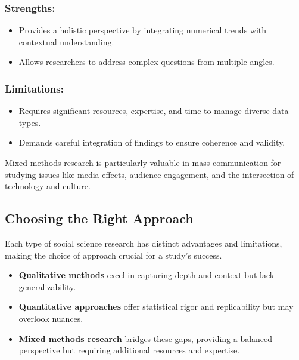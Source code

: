 \documentclass[
]{book}
\providecommand{\tightlist}{%
  \setlength{\itemsep}{0pt}\setlength{\parskip}{0pt}}
\begin{document}
\subsubsection*{Strengths:}\label{strengths-2}

\begin{itemize}
\tightlist
\item
  Provides a holistic perspective by integrating numerical trends with contextual understanding.
\item
  Allows researchers to address complex questions from multiple angles.
\end{itemize}

\subsubsection*{Limitations:}\label{limitations-2}

\begin{itemize}
\tightlist
\item
  Requires significant resources, expertise, and time to manage diverse data types.
\item
  Demands careful integration of findings to ensure coherence and validity.
\end{itemize}

Mixed methods research is particularly valuable in mass communication for studying issues like media effects, audience engagement, and the intersection of technology and culture.

\subsection*{Choosing the Right Approach}\label{choosing-the-right-approach}

Each type of social science research has distinct advantages and limitations, making the choice of approach crucial for a study's success.

\begin{itemize}
\tightlist
\item
  \textbf{Qualitative methods} excel in capturing depth and context but lack generalizability.
\item
  \textbf{Quantitative approaches} offer statistical rigor and replicability but may overlook nuances.
\item
  \textbf{Mixed methods research} bridges these gaps, providing a balanced perspective but requiring additional resources and expertise.
\end{itemize}
\end{document}

